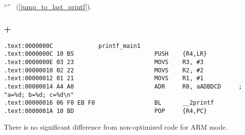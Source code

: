 ``\SwitchCaseDefaultSectionName'' 
~(\ref{jump_to_last_printf}).

\subsubsection{\OptimizingKeil + \ThumbMode}

\begin{lstlisting}[caption=\OptimizingKeil + \ThumbMode]
.text:0000000C             printf_main1
.text:0000000C 10 B5                       PUSH    {R4,LR}
.text:0000000E 03 23                       MOVS    R3, #3
.text:00000010 02 22                       MOVS    R2, #2
.text:00000012 01 21                       MOVS    R1, #1
.text:00000014 A4 A0                       ADR     R0, aADBDCD     ; "a=%d; b=%d; c=%d\n"
.text:00000016 06 F0 EB F8                 BL      __2printf
.text:0000001A 10 BD                       POP     {R4,PC}
\end{lstlisting}

{There is no significant difference from non-optimized code for ARM mode}.



